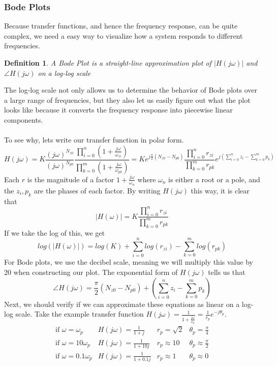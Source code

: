 \documentclass{article}
\newtheorem{definition}{Definition}
\begin{document}
\subsubsection{Bode Plots}
Because transfer functions, and hence the frequency response, can be quite complex, we need a easy way to visualize how a system responds to different frequencies.
\begin{definition}
    A Bode Plot is a straight-line approximation plot of $|H(j\omega)|$ and $\angle H(j\omega)$ on a log-log scale
\end{definition}
The log-log scale not only allows us to determine the behavior of Bode plots over a large range of frequencies,
but they also let us easily figure out what the plot looks like because it converts the frequency response into piecewise linear components.
\\\\To see why, lets write our transfer function in polar form. 
$$H(j\omega) = K \frac{(j\omega)^{N_{z0}}}{(j\omega)^{N_{p0}}}\frac{\prod_{i=0}^{n}{(1+\frac{j\omega}{\omega_{zi}})}}{\prod_{k=0}^{m}{(1+\frac{j\omega}{\omega_{pk}})}} = Ke^{j\frac{\pi}{2}(N_{z0}-N_{p0})} \frac{\prod_{i=0}^{n}{r_{zi}}}{\prod_{k=0}^{m}{r_{pk}}} e^{j(\sum_{i=0}^{n}{z_i} - \sum_{k=0}^{m}{p_k})}$$
Each $r$ is the magnitude of a factor $1 + \frac{j\omega}{\omega_n}$ where $\omega_n$ is either a root or a pole, and the $z_i, p_k$ are the phases of each factor.
By writing $H(j\omega)$ this way, it is clear that $$|H(\omega)| = K \frac{\prod_{i=0}^{n}{r_{zi}}}{\prod_{k=0}^{m}{r_{pk}}}$$
If we take the log of this, we get $$log(|H(\omega)|) = log(K) + \sum_{i=0}^{n}{log(r_{zi})} - \sum_{k=0}^{m}{log(r_{pk})}$$
For Bode plots, we use the decibel scale, meaning we will multiply this value by 20 when constructing our plot.
The exponential form of $H(j\omega)$ tells us that $$\angle H(j\omega) = \frac{\pi}{2}(N_{z0}-N_{p0})+ \left(\sum_{i=0}^{n}{z_i} - \sum_{k=0}^{m}{p_k}\right)$$
Next, we should verify if we can approximate these equations as linear on a log-log scale.
Take the example transfer function $H(j\omega) = \frac{1}{1+\frac{j\omega}{\omega_p}} = \frac{1}{r_p}e^{-j\theta_p}$.
\[
    \begin{array}{cccc}
        \text{if } \omega = \omega_p & H(j\omega) = \frac{1}{1+j} & r_p = \sqrt{2} & \theta_p = \frac{\pi}{4}\\
        \text{if } \omega = 10\omega_p & H(j\omega) = \frac{1}{1+10j} & r_p \approx 10 & \theta_p \approx \frac{\pi}{2}\\
        \text{if } \omega = 0.1\omega_p & H(j\omega) = \frac{1}{1+0.1j} & r_p \approx 1 & \theta_p \approx 0\\
    \end{array}
\]
\end{document}
